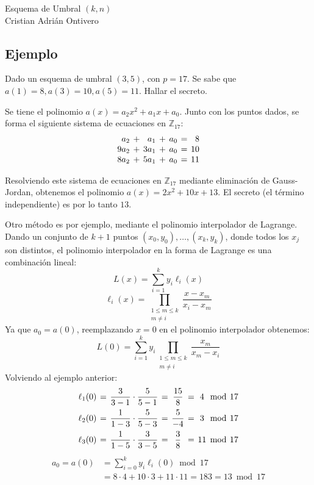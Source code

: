 \documentclass[spanish]{article}
\theoremstyle{definition}
\newcommand{\bb}[1]{\mathbb{#1}}
\newcommand{\Z}{\bb{Z}}
\newcommand{\m}{\mathbf{m}}
\begin{document}
\begin{center}
  {\LARGE Esquema de Umbral $(k,n)$ }\\[.2cm]
  Cristian Adrián Ontivero \\[.05cm]%
\end{center}


\vspace{0.2 cm}

\subsection*{Ejemplo}

Dado un esquema de umbral $(3,5)$, con $p = 17$. Se sabe que $a(1) = 8, a(3) =
10, a(5) = 11$. Hallar el secreto.

Se tiene el polinomio $a(x) = a_2x^2 + a_1x + a_0$. Junto con los puntos dados,
se forma el siguiente sistema de ecuaciones en $\Z_{17}$:
\[
\arraycolsep=2pt
  \begin{array}{rrrrrrr}
    a_2 &+& a_1 &+&  a_0 &=& 8\\
    9a_2 &+& 3a_1 &+& a_0 &=& 10\\
    8a_2 &+& 5a_1 &+& a_0 &=& 11
  \end{array}
\]

Resolviendo este sistema de ecuaciones en $\Z_{17}$ mediante eliminación de
Gauss-Jordan, obtenemos el polinomio $a(x) = 2x^2 + 10x + 13$. El secreto (el
término independiente) es por lo tanto $13$.

Otro método es por ejemplo, mediante el polinomio interpolador de Lagrange.
Dando un conjunto de $k+1$ puntos $(x_0, y_0),\dots,(x_k,y_k)$, donde todos los
$x_j$ son distintos, el polinomio interpolador en la forma de Lagrange es una
combinación lineal:
\[ 
  L(x) = \sum_{i=1}^k y_i \ell_i(x)
\] 
\[
  \ell_i(x) = \prod_{\substack{1 \leq m \leq k\\m \neq i}} \frac{x - x_m}{x_i - x_m}
\]
Ya que $a_0 = a(0)$, reemplazando $x = 0$ en el polinomio interpolador obtenemos:
\[ L(0) = \sum_{i=1}^k y_i \prod_{\substack{1 \leq m \leq k\\m \neq i}} \frac{x_m}{x_m - x_i} \] 
Volviendo al ejemplo anterior:
\[
  \arraycolsep=2pt
\begin{array}{lccccccl}
  \ell_1(0) &=& \dfrac{3}{3-1}\cdot\dfrac{5}{5-1} &=& \dfrac{15}{8} &=& 4 &\bmod{~17}\\[2ex]
  \ell_2(0) &=& \dfrac{1}{1-3}\cdot\dfrac{5}{5-3} &=& \dfrac{5}{-4} &=& 3 &\bmod{~17}\\[2ex]
  \ell_3(0) &=& \dfrac{1}{1-5}\cdot\dfrac{3}{3-5} &=& \dfrac{3}{8} &=& 11 &\bmod{~17}
\end{array}
\]
  \begin{align*}
    a_0 = a(0) &=\sum_{i=0}^k y_i \ell_i(0) \bmod{17}\\
    &= 8\cdot4 + 10\cdot3 + 11\cdot11 = 183 = 13 \bmod{17}\\
  \end{align*}
\end{document}
